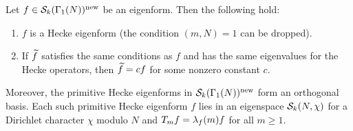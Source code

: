       \begin{theorem}\label{thm:newforms_characterization_modular}
        Let $f \in \mathcal{S}_{k}(\Gamma_{1}(N))^{\mathrm{new}}$ be an eigenform. Then the following hold:
        \begin{enumerate}[label=(\roman*)]
          \item $f$ is a Hecke eigenform (the condition $(m,N) = 1$ can be dropped).
          \item If $\widetilde{f}$ satisfies the same conditions as $f$ and has the same eigenvalues for the Hecke operators, then $\widetilde{f} = cf$ for some nonzero constant $c$.
        \end{enumerate}
        Moreover, the primitive Hecke eigenforms in $\mathcal{S}_{k}(\Gamma_{1}(N))^{\mathrm{new}}$ form an orthogonal basis. Each such primitive Hecke eigenform $f$ lies in an eigenspace $\mathcal{S}_{k}(N,\chi)$ for a Dirichlet character $\chi$ modulo $N$ and $T_{m}f = \lambda_{f}(m)f$ for all $m \ge 1$.
      \end{theorem}

